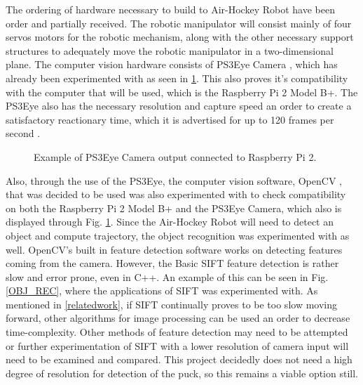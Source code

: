 \documentclass[letterpaper, 10 pt, conference]{ieeeconf}
\begin{document}
The ordering of hardware necessary to build to Air-Hockey Robot have been order and partially received.  The robotic manipulator will consist mainly of four servos motors for the robotic mechanism, along with the other necessary support structures to adequately move the robotic manipulator in a two-dimensional plane.  The computer vision hardware consists of PS3Eye Camera \cite{ps3eye}, which has already been experimented with as seen in \ref{PS3_EYE}.  This also proves it's compatibility with the computer that will be used, which is the Raspberry Pi 2 Model B+. The PS3Eye also has the necessary resolution and capture speed an order to create a satisfactory reactionary time, which it is advertised for up to 120 frames per second \cite{ps3eye}.

\begin{figure}[!h]
\centering
{}
\caption{Example of PS3Eye Camera output connected to Raspberry Pi 2.}
\label{PS3_EYE}
\end{figure}

Also, through the use of the PS3Eye, the computer vision software, OpenCV \cite{opencv}, that was decided to be used was also experimented with to check compatibility on both the Raspberry Pi 2 Model B+ and the PS3Eye Camera, which also is displayed through Fig. \ref{PS3_EYE}.  Since the Air-Hockey Robot will need to detect an object and compute trajectory, the object recognition was experimented with as well. OpenCV’s built in feature detection software works on detecting features coming from the camera. However, the Basic SIFT feature detection is rather slow and error prone, even in C++. An example of this can be seen in Fig. \ref{OBJ_REC}, where the applications of SIFT was experimented with.  As mentioned in \ref{relatedwork}, if SIFT continually proves to be too slow moving forward, other algorithms for image processing can be used an order to decrease time-complexity.  Other methods of feature detection may need to be attempted or further experimentation of SIFT with a lower resolution of camera input will need to be examined and compared. This project decidedly does not need a high degree of resolution for detection of the puck, so this remains a viable option still.
\end{document}
